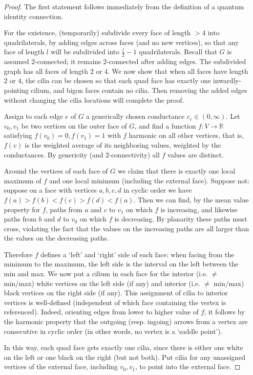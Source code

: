 \documentclass[12pt, reqno]{amsart}
\theoremstyle{definition}
\newcommand{\R}{\mathbb{R}}%
\begin{document}
\begin{proof} 
The first statement follows  immediately from the definition of a quantum identity connection.

For the existence, (temporarily) subdivide every face of length $>4$ into quadrilaterals, by adding edges across faces (and no new vertices),   so that any face of length $l$ will be subdivided into $\frac{l}2-1$ quadrilaterals.  Recall that  $G$ is assumed $2$-connected; it remains $2$-connected after adding edges.   The subdivided graph has all faces of  length $2$ or $4$.  We now show that when all faces have length $2$ or $4$, the cilia can be chosen so that each quad face has exactly one inwardly-pointing cilium, and bigon faces contain no cilia. Then removing the added edges without changing the cilia locations will complete the proof. 

Assign to each edge $e$ of $G$ a generically chosen conductance $c_e\in(0,\infty)$. Let $v_0,v_1$ be two vertices on the outer face of $G$, and find a function $f:V\to\R$   satisfying $f(v_0)=0, f(v_1)=1$ with $f$ harmonic on all other vertices, that is, $f(v)$ is the weighted average of its neighboring values,   weighted by the conductances. By genericity (and $2$-connectivity) all $f$ values are distinct. 

Around the vertices of each face of $G$ we claim that there is exactly one local maximum of $f$ and one local minimum (including the external face).   Suppose not: suppose on a face with vertices $a,b,c,d$ in cyclic order we have $f(a)>f(b)<f(c)>f(d)<f(a)$.     Then we can find, by the mean value property for $f$,  paths from $a$ and $c$ to $v_1$ on which $f$ is increasing,   and likewise paths from $b$ and $d$ to $v_0$  on which $f$ is decreasing. By planarity these paths must cross,   violating the fact that the values on the increasing paths are all larger than the values on the decreasing paths. 

Therefore $f$ defines a `left' and `right' side of each face: when facing from the minimum to the maximum, the left side is the  interval on the left between the min and max.  We now put a cilium in each face for the interior (i.e. $\neq$ min/max) white vertices on the left side (if any) and interior (i.e. $\neq$ min/max) black vertices on the right side (if any).  This assignment of cilia to interior vertices is well-defined (independent of which face containing the vertex is referenced).  Indeed, orienting edges from lower to higher value of $f$, it follows by the harmonic property that the outgoing (resp. ingoing) arrows from a vertex are consecutive in cyclic order (in other words, no vertex is a `saddle point').

In this way, each quad face gets exactly one cilia, since there is either one white on the left or one black on the right (but not both).    Put cilia for any unassigned vertices of the external face, including $v_0,v_1$, to point into the external face.
\end{proof}
\end{document}
